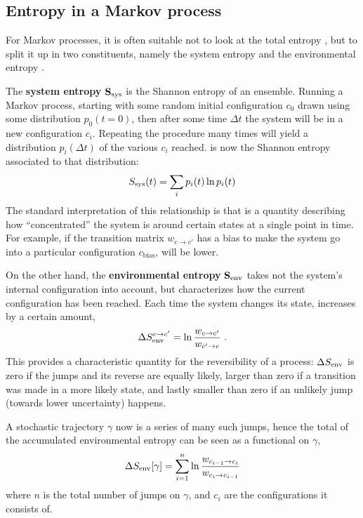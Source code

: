 \subsection{Entropy in a Markov process}

For Markov processes, it is often suitable not to look at the total entropy \STot{}, but to split it up in two constituents, namely the system entropy \SSys{} and the environmental entropy \SEnv{}.

The \textbf{system entropy} \(\mathbf{S_\text{sys}{}}\) is the Shannon entropy of an ensemble. Running a Markov process, starting with some random initial configuration \(c_0\) drawn using some distribution \(p_0(t=0)\), then after some time \(\Delta t\) the system will be in a new configuration \(c_i\). Repeating the procedure many times will yield a distribution \(p_i(\Delta t)\) of the various \(c_i\) reached. \SSys{} is now the Shannon entropy associated to that distribution:
%
\begin{align}
	S_\text{sys}(t) = \sum_i p_i(t)\ln p_i(t)
\end{align}
%
The standard interpretation of this relationship is that \SSys{} is a quantity describing how ``concentrated'' the system is around certain states at a single point in time. For example, if the transition matrix \(w_{c\to c'}\) has a bias to make the system go into a particular configuration \(c_\text{bias}\), \SSys will be lower.

On the other hand, the \textbf{environmental entropy} \(\mathbf{S_\text{env}{}}\) takes not the system's internal configuration into account, but characterizes how the current configuration has been reached. Each time the system changes its state, \SEnv{} increases by a certain amount,
%
\begin{align}
	\label{eqn:SEnv single jump definition}
	\Delta S_\text{env}^{c\to c'} = \ln\frac{w_{c\to c'}}{w_{c'\to c}} ~.
\end{align}
%
This provides a characteristic quantity for the reversibility of a process: \(\Delta S_\text{env}\) is zero if the jumps and its reverse are equally likely, larger than zero if a transition was made in a more likely state, and lastly smaller than zero if an unlikely jump (towards lower uncertainty) happens.

A stochastic trajectory \(\gamma\) now is a series of many such jumps, hence the total of the accumulated environmental entropy can be seen as a functional on \(\gamma\),
%
\begin{align}
	\label{eqn:SEnv rate jump functional}
	\Delta S_\text{env}[\gamma] = \sum_{i=1}^n\ln\frac{w_{c_{i-1}\to c_i}}{w_{c_i\to c_{i-1}}}
\end{align}
%
where \(n\) is the total number of jumps on \(\gamma\), and \(c_i\) are the configurations it consists of.




